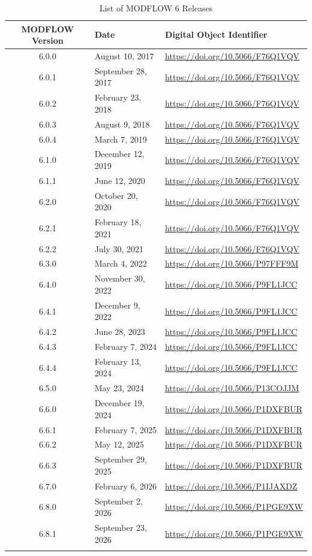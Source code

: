 \documentclass[11pt,twoside,twocolumn]{usgsreport}
\begin{document}
\begin{table}[h]
\begin{center}
\caption{List of MODFLOW 6 Releases}
\small 
\begin{tabular*}{13cm}{cll}
\hline
\hline
\textbf{MODFLOW Version} & \textbf{Date} & \textbf{Digital Object Identifier}\\
\hline
6.0.0 & August 10, 2017 & \url{https://doi.org/10.5066/F76Q1VQV} \\
6.0.1 & September 28, 2017 & \url{https://doi.org/10.5066/F76Q1VQV} \\
6.0.2 & February 23, 2018 & \url{https://doi.org/10.5066/F76Q1VQV} \\
6.0.3 & August 9, 2018 & \url{https://doi.org/10.5066/F76Q1VQV} \\
6.0.4 & March 7, 2019 & \url{https://doi.org/10.5066/F76Q1VQV} \\
6.1.0 & December 12, 2019 & \url{https://doi.org/10.5066/F76Q1VQV} \\
6.1.1 & June 12, 2020 & \url{https://doi.org/10.5066/F76Q1VQV} \\
6.2.0 & October 20, 2020 & \url{https://doi.org/10.5066/F76Q1VQV} \\
6.2.1 & February 18, 2021 & \url{https://doi.org/10.5066/F76Q1VQV} \\
6.2.2 & July 30, 2021 & \url{https://doi.org/10.5066/F76Q1VQV} \\
6.3.0 & March 4, 2022 & \url{https://doi.org/10.5066/P97FFF9M} \\
6.4.0 & November 30, 2022 & \url{https://doi.org/10.5066/P9FL1JCC} \\
6.4.1 & December 9, 2022 & \url{https://doi.org/10.5066/P9FL1JCC} \\
6.4.2 & June 28, 2023 & \url{https://doi.org/10.5066/P9FL1JCC} \\
6.4.3 & February 7, 2024 & \url{https://doi.org/10.5066/P9FL1JCC} \\
6.4.4 & February 13, 2024 & \url{https://doi.org/10.5066/P9FL1JCC} \\
6.5.0 & May 23, 2024 & \url{https://doi.org/10.5066/P13COJJM} \\
6.6.0 & December 19, 2024 & \url{https://doi.org/10.5066/P1DXFBUR} \\
6.6.1 & February 7, 2025 & \url{https://doi.org/10.5066/P1DXFBUR} \\
6.6.2 & May 12, 2025 & \url{https://doi.org/10.5066/P1DXFBUR} \\
6.6.3 & September 29, 2025 & \url{https://doi.org/10.5066/P1DXFBUR} \\
6.7.0 & February 6, 2026 & \url{https://doi.org/10.5066/P1IJAXDZ} \\
6.8.0 & September 2, 2026 & \url{https://doi.org/10.5066/P1PGE9XW} \\
6.8.1 & September 23, 2026 & \url{https://doi.org/10.5066/P1PGE9XW} \\
\hline
\label{tab:releases}
\end{tabular*}
\end{center}
\normalsize
\end{table}
\end{document}
